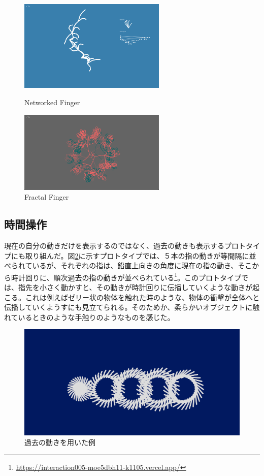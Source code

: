 \begin{figure}[htbp]
  \begin{minipage}[b]{0.5\linewidth}
    \centering
    \includegraphics[keepaspectratio, width=7cm]{img/networked_finger.png}
    \caption{Networked Finger}
    \label{fig:networked_finger}
  \end{minipage}
  \begin{minipage}[b]{0.5\linewidth}
    \centering
    \includegraphics[keepaspectratio, width=7cm]{img/fractel_finger.png}
    \caption{Fractal Finger}
    \label{fig:fractal_finger}
  \end{minipage}
\end{figure}

\subsection{時間操作}
現在の自分の動きだけを表示するのではなく、過去の動きも表示するプロトタイプにも取り組んだ。図\ref{fig:prototype_delay}に示すプロトタイプでは、５本の指の動きが等間隔に並べられているが、それぞれの指は、鉛直上向きの角度に現在の指の動き、そこから時計回りに、順次過去の指の動きが並べられている\footnote{\url{https://interaction005-moe5dbh11-k1105.vercel.app/}}。このプロトタイプでは、指先を小さく動かすと、その動きが時計回りに伝播していくような動きが起こる。これは例えばゼリー状の物体を触れた時のような、物体の衝撃が全体へと伝播していくようすにも見立てられる。そのためか、柔らかいオブジェクトに触れているときのような手触りのようなものを感じた。

\begin{figure}[H]
  \centering
  \includegraphics[width=15cm]{img/past_time.png}
  \caption{過去の動きを用いた例}
  \label{fig:prototype_delay}
\end{figure}

